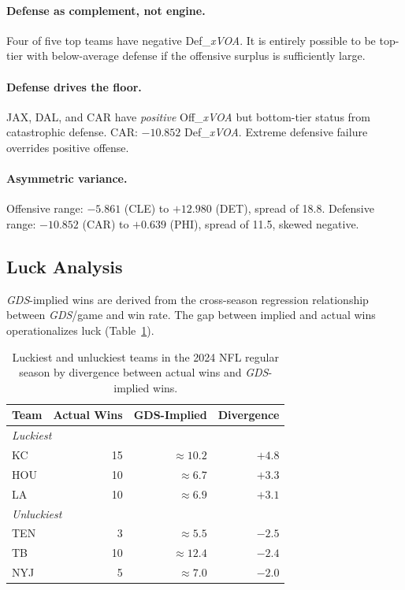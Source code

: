 \documentclass[12pt,a4paper]{article}
\newcommand{\xvoa}{\textit{xVOA}}
\newcommand{\gds}{\textit{GDS}}
\begin{document}
\paragraph{Defense as complement, not engine.} Four of five top teams have negative Def\_\xvoa{}. It is entirely possible to be top-tier with below-average defense if the offensive surplus is sufficiently large.

\paragraph{Defense drives the floor.} JAX, DAL, and CAR have \emph{positive} Off\_\xvoa{} but bottom-tier status from catastrophic defense. CAR: $-10.852$ Def\_\xvoa{}. Extreme defensive failure overrides positive offense.

\paragraph{Asymmetric variance.} Offensive range: $-5.861$ (CLE) to $+12.980$ (DET), spread of 18.8. Defensive range: $-10.852$ (CAR) to $+0.639$ (PHI), spread of 11.5, skewed negative.

\subsection{Luck Analysis}
\label{sec:luck-analysis}

\gds{}-implied wins are derived from the cross-season regression relationship between \gds{}/game and win rate. The gap between implied and actual wins operationalizes luck (Table~\ref{tab:luck}).

\begin{table}[htbp]
  \centering
  \caption{Luckiest and unluckiest teams in the 2024 NFL regular season by divergence between actual wins and \gds{}-implied wins.}
  \label{tab:luck}
  \begin{tabular}{lrrr}
    \toprule
    \textbf{Team} & \textbf{Actual Wins} & \textbf{GDS-Implied} & \textbf{Divergence} \\
    \midrule
    \multicolumn{4}{l}{\textit{Luckiest}} \\[2pt]
    KC  & 15 & ${\approx}10.2$ & $+4.8$ \\
    HOU & 10 & ${\approx}6.7$  & $+3.3$ \\
    LA  & 10 & ${\approx}6.9$  & $+3.1$ \\[6pt]
    \multicolumn{4}{l}{\textit{Unluckiest}} \\[2pt]
    TEN &  3 & ${\approx}5.5$  & $-2.5$ \\
    TB  & 10 & ${\approx}12.4$ & $-2.4$ \\
    NYJ &  5 & ${\approx}7.0$  & $-2.0$ \\
    \bottomrule
  \end{tabular}
\end{table}
\end{document}
